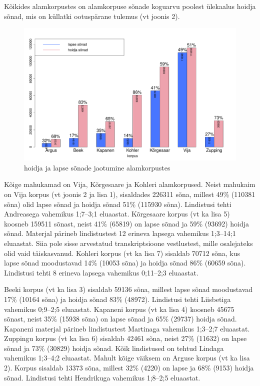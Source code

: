 \documentclass[12pt]{article}
\begin{document}
Kõikides alamkorpustes on alamkorpuse sõnade koguarvu poolest ülekaalus hoidja sõnad, mis on küllatki ootuspärane tulemus (vt joonis 2).

\begin{figure}[H]
    \centering
    \includegraphics[width=\textwidth]{koik_korpus_sonad}
    \caption{hoidja ja lapse sõnade jaotumine alamkorpustes}
\end{figure}

Kõige mahukamad on Vija, Kõrgesaare ja Kohleri alamkorpused. Neist mahukaim on Vija korpus (vt joonis 2 ja lisa 1), sisaldades 226311 sõna, millest 49\% (110381 sõna) olid lapse sõnad ja hoidja sõnad 51\% (115930 sõna). Lindistusi tehti Andreasega vahemikus 1;7--3;1 eluaastat. Kõrgesaare korpus (vt ka lisa 5) koosneb 159511 sõnast, neist 41\% (65819) on lapse sõnad ja 59\% (93692) hoidja sõnad. Materjal pärineb lindistustest 12 erineva lapsega vahemikus 1;3--14;1 eluaastat. Siia pole sisse arvestatud transkriptsioone vestlustest, mille osalejateks olid vaid täiskasvanud. Kohleri korpus (vt ka lisa 7) sisaldab 70712 sõna, kus lapse sõnad moodustavad 14\% (10053 sõna) ja hoidja sõnad 86\% (60659 sõna). Lindistusi tehti 8 erineva lapsega vahemikus 0;11--2;3 eluaastat.

Beeki korpus (vt ka lisa 3) sisaldab 59136 sõna, millest lapse sõnad moodustavad 17\% (10164 sõna) ja hoidja sõnad 83\% (48972). Lindistusi tehti Liisbetiga vahemikus 0;9--2;5 eluaastat. Kapaneni korpus (vt ka lisa 4) koosneb 45675 sõnast, neist 35\% (15938 sõna) on lapse sõnad ja 65\% (29737) hoidja sõnad. Kapaneni materjal pärineb lindistustest Martinaga vahemikus 1;3--2;7 eluaastat. Zuppingu korpus (vt ka lisa 6) sisaldab 42461 sõna, neist 27\% (11632) on lapse sõnad ja 73\% (30829) hoidja sõnad. Kõik lindistused on tehtud Lindaga vahemikus 1;3--4;2 eluaastat. Mahult kõige väiksem on Arguse korpus (vt ka lisa 2). Korpus sisaldab 13373 sõna, millest 32\% (4220) on lapse ja 68\% (9153) hoidja sõnad. Lindistusi tehti Hendrikuga vahemikus 1;8--2;5 eluaastat.
\end{document}
